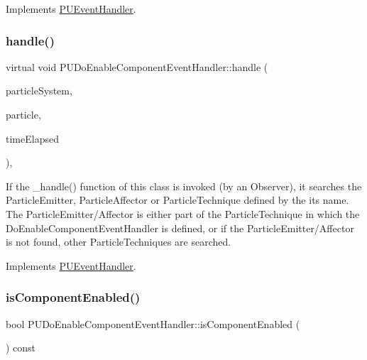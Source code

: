 Implements \hyperlink{classPUEventHandler_a760172609708c65548dcac364c9b3b9c}{P\+U\+Event\+Handler}.

\mbox{\label{classPUDoEnableComponentEventHandler_a6d84593dc83b908717c15a5c973d10b4}} 
\subsubsection{\texorpdfstring{handle()}{handle()}\hspace{0.1cm}{\footnotesize\ttfamily [2/2]}}
{\footnotesize\ttfamily virtual void P\+U\+Do\+Enable\+Component\+Event\+Handler\+::handle (\begin{DoxyParamCaption}\item[{\hyperlink{classPUParticleSystem3D}{P\+U\+Particle\+System3D} $\ast$}]{particle\+System,  }\item[{\hyperlink{structPUParticle3D}{P\+U\+Particle3D} $\ast$}]{particle,  }\item[{float}]{time\+Elapsed }\end{DoxyParamCaption})\hspace{0.3cm}{\ttfamily [override]}, {\ttfamily [virtual]}}

If the \+\_\+handle() function of this class is invoked (by an Observer), it searches the Particle\+Emitter, Particle\+Affector or Particle\+Technique defined by the its name. The Particle\+Emitter/\+Affector is either part of the Particle\+Technique in which the Do\+Enable\+Component\+Event\+Handler is defined, or if the Particle\+Emitter/\+Affector is not found, other Particle\+Techniques are searched. 

Implements \hyperlink{classPUEventHandler_a760172609708c65548dcac364c9b3b9c}{P\+U\+Event\+Handler}.

\mbox{\label{classPUDoEnableComponentEventHandler_a672806e3c52023c95646c1841a021b3d}} 
\subsubsection{\texorpdfstring{is\+Component\+Enabled()}{isComponentEnabled()}\hspace{0.1cm}{\footnotesize\ttfamily [1/2]}}
{\footnotesize\ttfamily bool P\+U\+Do\+Enable\+Component\+Event\+Handler\+::is\+Component\+Enabled (\begin{DoxyParamCaption}\item[{void}]{ }\end{DoxyParamCaption}) const\hspace{0.3cm}{\ttfamily [inline]}}

